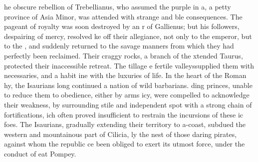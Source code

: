 





he obscure rebellion of Trebellianus, who assumed the purple in
a, a petty province of Asia Minor, was attended with strange and
ble consequences. The pageant of royalty was soon destroyed by an
r of Gallienus; but his followers, despairing of mercy, resolved
ke off their allegiance, not only to the emperor, but to the
, and suddenly returned to the savage manners from which they had
perfectly been reclaimed. Their craggy rocks, a branch of the
xtended Taurus, protected their inaccessible retreat. The tillage
e fertile valleys\footnotemark[177] supplied them with necessaries, and a habit
ine with the luxuries of life. In the heart of the Roman
hy, the Isaurians long continued a nation of wild barbarians.
ding princes, unable to reduce them to obedience, either by arms
icy, were compelled to acknowledge their weakness, by surrounding
stile and independent spot with a strong chain of fortifications,
ich often proved insufficient to restrain the incursions of these
ic foes. The Isaurians, gradually extending their territory to
a-coast, subdued the western and mountainous part of Cilicia,
ly the nest of those daring pirates, against whom the republic
ce been obliged to exert its utmost force, under the conduct of
eat Pompey.\footnotemark[179]

